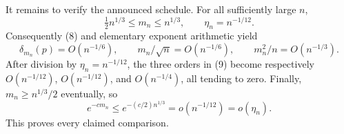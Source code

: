It remains to verify the announced schedule.  For all sufficiently large \(n\),
\[
\tfrac12n^{1/3}\leq m_n\leq n^{1/3},
\qquad
\eta_n=n^{-1/12}.
\]
Consequently (8) and elementary exponent arithmetic yield
\[
\delta_{m_n}(p)=O(n^{-1/6}),\qquad
m_n/\sqrt n=O(n^{-1/6}),\qquad
m_n^2/n=O(n^{-1/3}).
\tag{9}
\]
After division by \(\eta_n=n^{-1/12}\), the three orders in (9) become respectively \(O(n^{-1/12})\), \(O(n^{-1/12})\), and \(O(n^{-1/4})\), all tending to zero.  Finally, \(m_n\geq n^{1/3}/2\) eventually, so
\[
e^{-cm_n}\leq e^{-(c/2)n^{1/3}}=o(n^{-1/12})=o(\eta_n).
\]
This proves every claimed comparison.